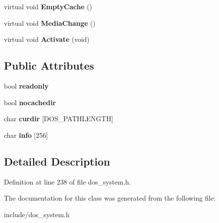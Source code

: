 \begin{DoxyCompactItemize}
\item 
\hypertarget{classDOS__Drive_a2ec8efe8d1b50b3c8a7b3bde52000e0e}{virtual void {\bfseries Empty\-Cache} ()}\label{classDOS__Drive_a2ec8efe8d1b50b3c8a7b3bde52000e0e}

\item 
\hypertarget{classDOS__Drive_aceabb46a487741d6c63241539811e80d}{virtual void {\bfseries Media\-Change} ()}\label{classDOS__Drive_aceabb46a487741d6c63241539811e80d}

\item 
\hypertarget{classDOS__Drive_a1007125b58463bbffb07d890fd6f1c61}{virtual void {\bfseries Activate} (void)}\label{classDOS__Drive_a1007125b58463bbffb07d890fd6f1c61}

\end{DoxyCompactItemize}
\subsection*{Public Attributes}
\begin{DoxyCompactItemize}
\item 
\hypertarget{classDOS__Drive_aa7a3f21acf8787c1bad16d2c4fb5c53c}{bool {\bfseries readonly}}\label{classDOS__Drive_aa7a3f21acf8787c1bad16d2c4fb5c53c}

\item 
\hypertarget{classDOS__Drive_ab8a268c6350773fa0e8b8c000b691447}{bool {\bfseries nocachedir}}\label{classDOS__Drive_ab8a268c6350773fa0e8b8c000b691447}

\item 
\hypertarget{classDOS__Drive_a781fd315606de345f8eab325c2a17c2e}{char {\bfseries curdir} \mbox{[}D\-O\-S\-\_\-\-P\-A\-T\-H\-L\-E\-N\-G\-T\-H\mbox{]}}\label{classDOS__Drive_a781fd315606de345f8eab325c2a17c2e}

\item 
\hypertarget{classDOS__Drive_a3e2b1d7526c099ba38ba991b9d2623e1}{char {\bfseries info} \mbox{[}256\mbox{]}}\label{classDOS__Drive_a3e2b1d7526c099ba38ba991b9d2623e1}

\end{DoxyCompactItemize}


\subsection{Detailed Description}


Definition at line 238 of file dos\-\_\-system.\-h.



The documentation for this class was generated from the following file\-:\begin{DoxyCompactItemize}
\item 
include/dos\-\_\-system.\-h\end{DoxyCompactItemize}
